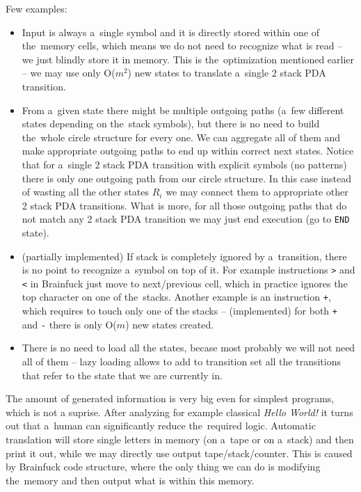 \documentclass[english,shortabstract,mgr]{iithesis}
\begin{document}
Few examples:
\begin{itemize}
  \item Input is always a~single symbol and it is directly stored within one of the~memory cells,
      which means we do not need to recognize what is read -- we just blindly store it in memory.
      This is the~optimization mentioned earlier -- we may use only O($m^2$) new states to translate
      a~single 2 stack PDA transition.
  \item From a~given state there might be multiple outgoing paths (a~few different states depending
      on the~stack symbols), but there is no need to build the~whole circle structure for every one.
      We can aggregate all of them and make appropriate outgoing paths to end up within correct
      next states. Notice that for a~single 2 stack PDA transition with explicit symbols (no patterns)
      there is only one outgoing path from our circle structure. In this case instead of wasting all
      the other states $R_i$ we may connect them to appropriate other 2 stack PDA transitions.
      What is more, for all those outgoing paths that do not match any 2 stack PDA transition
      we may just end execution (go to \texttt{END} state).
  \item (partially implemented) If stack is completely ignored by a~transition, there is no point
      to recognize a~symbol on top of it. For example instructions \texttt{>} and \texttt{<}
      in Brainfuck just move to next/previous cell, which in practice ignores the top
      character on one of the~stacks. Another example is an instruction \texttt{+},
      which requires to touch only one of the stacks -- (implemented) for both
      \texttt{+} and \texttt{-} there is only O($m$) new states created.
  \item There is no need to load all the states, becase most probably we will
      not need all of them -- lazy loading allows to add to transition set
      all the transitions that refer to the state that we are currently in.
\end{itemize}

The amount of generated information is very big even for simplest programs, which is not a suprise.
After analyzing for example classical \textit{Hello World!} it turns out that a~human can
significantly reduce the~required logic. Automatic translation will store single letters
in memory (on a~tape or on a~stack) and then print it out, while we may directly use output
tape/stack/counter. This is caused by Brainfuck code structure, where the only thing we can do
is modifying the~memory and then output what is within this memory.
\end{document}
